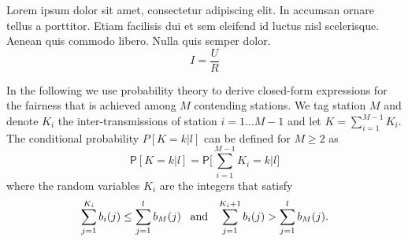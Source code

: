 Lorem ipsum dolor sit amet, consectetur adipiscing elit. In accumsan ornare tellus a porttitor. Etiam facilisis dui et sem eleifend id luctus nisl scelerisque. Aenean quis commodo libero. Nulla quis semper dolor.
%
\begin{equation}
 I = \frac{U}{R}
\end{equation}

In the following we use probability theory to derive closed-form expressions for the fairness that is achieved among $M$ contending stations. We tag station $M$ and denote $K_i$ the inter-transmissions of station $i = 1 \dots M-1$ and let $K = \sum_{i=1}^{M-1} K_i$. The conditional probability $P[K\!=\!k|l]$ can be defined for $M \ge 2$ as
%
\begin{equation}
\mathsf{P}[K\!=\!k|l] = \mathsf{P} \Biggl[\sum_{i=1}^{M-1} K_i = k \Big| l \Biggr]
\label{eq:chapter03:exactpmf}
\end{equation}
%
where the random variables $K_i$ are the integers that satisfy
%
\begin{equation*}
\sum_{j=1}^{K_i} b_i(j) \le \sum_{j=1}^{l} b_M(j) \;\;\; \textmd{and} \;\;\; \sum_{j=1}^{K_i+1} b_i(j) > \sum_{j=1}^{l} b_M(j) .
\end{equation*}


%
%
